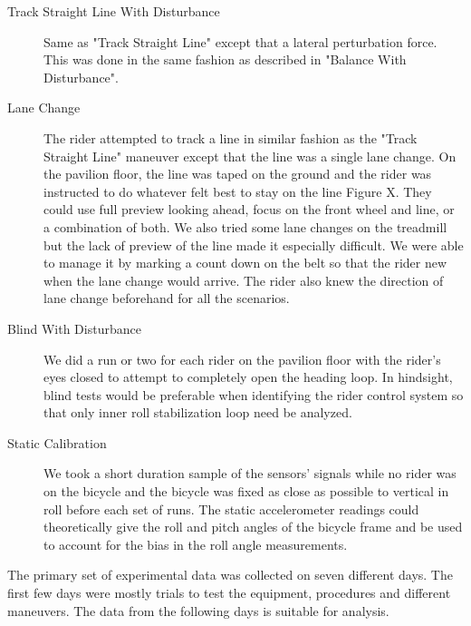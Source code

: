 \documentclass{article}
\begin{document}
\begin{description}
  \item[Track Straight Line With Disturbance] Same as "Track Straight Line"
    except that a lateral perturbation force. This was done in the same fashion
    as described in "Balance With Disturbance".
  \item[Lane Change] The rider attempted to track a line in similar fashion as
    the "Track Straight Line" maneuver except that the line was a single lane
    change. On the pavilion floor, the line was taped on the ground and the
    rider was instructed to do whatever felt best to stay on the line Figure X.
    They could use full preview looking ahead, focus on the front wheel and
    line, or a combination of both.  We also tried some lane changes on the
    treadmill but the lack of preview of the line made it especially difficult.
    We were able to manage it by marking a count down on the belt so that the
    rider new when the lane change would arrive. The rider also knew the
    direction of lane change beforehand for all the scenarios.
  \item[Blind With Disturbance] We did a run or two for each rider on the
    pavilion floor with the rider's eyes closed to attempt to completely open
    the heading loop. In hindsight, blind tests would be preferable when
    identifying the rider control system so that only inner roll stabilization
    loop need be analyzed.
  \item[Static Calibration] We took a short duration sample of the sensors'
    signals while no rider was on the bicycle and the bicycle was fixed as
    close as possible to vertical in roll before each set of runs. The static
    accelerometer readings could theoretically give the roll and pitch angles
    of the bicycle frame and be used to account for the bias in the roll angle
    measurements.
\end{description}


The primary set of experimental data was collected on seven different days. The
first few days were mostly trials to test the equipment, procedures and
different maneuvers. The data from the following days is suitable for analysis.
\end{document}
